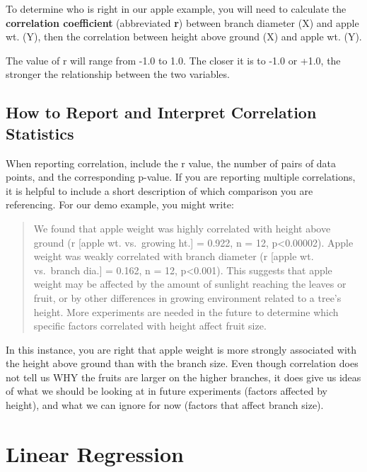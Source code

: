 \documentclass[
]{book}
\begin{document}
To determine who is right in our apple example, you will need to calculate the \textbf{correlation coefficient} (abbreviated \textbf{r}) between branch diameter (X) and apple wt. (Y), then the correlation between height above ground (X) and apple wt. (Y).

The value of r will range from -1.0 to 1.0. The closer it is to -1.0 or +1.0, the stronger the relationship between the two variables.

\hypertarget{how-to-report-and-interpret-correlation-statistics}{%
\subsection{How to Report and Interpret Correlation Statistics}\label{how-to-report-and-interpret-correlation-statistics}}

When reporting correlation, include the r value, the number of pairs of data points, and the corresponding p-value. If you are reporting multiple correlations, it is helpful to include a short description of which comparison you are referencing. For our demo example, you might write:

\begin{quote}
We found that apple weight was highly correlated with height above ground (r {[}apple wt. vs.~growing ht.{]} = 0.922, n = 12, p\textless0.00002). Apple weight was weakly correlated with branch diameter (r {[}apple wt. vs.~branch dia.{]} = 0.162, n = 12, p\textless0.001). This suggests that apple weight may be affected by the amount of sunlight reaching the leaves or fruit, or by other differences in growing environment related to a tree's height. More experiments are needed in the future to determine which specific factors correlated with height affect fruit size.
\end{quote}

In this instance, you are right that apple weight is more strongly associated with the height above ground than with the branch size. Even though correlation does not tell us WHY the fruits are larger on the higher branches, it does give us ideas of what we should be looking at in future experiments (factors affected by height), and what we can ignore for now (factors that affect branch size).

\hypertarget{linear-regression}{%
\section{Linear Regression}\label{linear-regression}}
\end{document}
